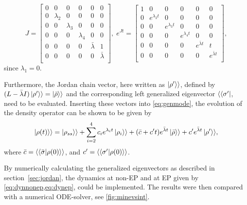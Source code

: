 \documentclass[../main.tex]{subfiles}
\begin{document}
\begin{equation}
    J = \begin{bmatrix} 0 & 0 & 0 & 0 & 0 & 0 \\
                        0 & \lambda_2 & 0 & 0 & 0 & 0 \\
                        0 & 0 & \lambda_3 & 0 & 0 & 0 \\
                        0 & 0 & 0 & \lambda_4 & 0 & 0 \\
                        0 & 0 & 0 & 0 & \bar \lambda & 1 \\
                        0 & 0 & 0 & 0 & 0 & \bar \lambda \\ \end{bmatrix}, \; 
        e^{Jt} = \begin{bmatrix} 1 & 0 & 0 & 0 & 0 & 0 \\
            0 & e^{\lambda_2t} & 0 & 0 & 0 & 0 \\
            0 & 0 & e^{\lambda_3t} & 0 & 0 & 0 \\
            0 & 0 & 0 & e^{\lambda_4t} & 0 & 0 \\
            0 & 0 & 0 & 0 & e^{\bar \lambda t} & t \\
        0 & 0 & 0 & 0 & 0 & e^{\bar \lambda t} \\ \end{bmatrix},
\end{equation}
since $\lambda_1 = 0$.

Furthermore, the Jordan chain vector, here written as $\ket{\rho'}\rangle$, defined by $(L - \bar\lambda I)\ket{\rho'}\rangle = \ket{\bar\rho}\rangle$ and the corresponding left generalized eigenvector $\langle\bra{\sigma'}$, need to be evaluated. Inserting these vectors into \cref{eq:genmode}, the evolution of the density operator can be shown to be given by
\begin{equation}\label{eq:dynep}
    \begin{aligned}
        \ket{\rho(t)}\rangle = \ket{\rho_{ss}}\rangle + \sum_{i=2}^4 c_i e^{\lambda_i t} \ket{\rho_i}\rangle  
                                + (\bar c + c't)e^{\bar \lambda t}\ket{\bar \rho}\rangle + c'e^{\bar\lambda t}\ket{\rho'}\rangle,
    \end{aligned}
\end{equation}
where $\bar c = \langle\braket{\bar\sigma|\rho(0)}\rangle$, and $c' = \langle\braket{\sigma'|\rho(0)}\rangle$.

By numerically calculating the generalized eigenvectors as described in section~\ref{sec:jordan}, the dynamics at non-EP and at EP given by \cref{eq:dynnonep,eq:dynep}, could be implemented. The results were then compared with a numerical ODE-solver, see \cref{fig:minevsint}.
\end{document}
